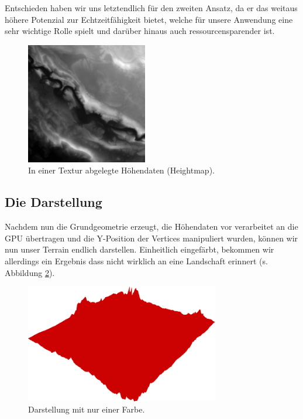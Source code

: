 \begin{Spacing}{\mylinespace}
Entschieden haben wir uns letztendlich für den zweiten Ansatz, da er das weitaus höhere Potenzial zur Echtzeitfähigkeit bietet, welche für unsere Anwendung eine sehr wichtige Rolle spielt und darüber hinaus auch ressourcensparender ist. 

\begin{figure}[h!]
	\centering
	\vspace*{20px}
	\includegraphics[width=200px]{graphics/heightmap.jpg}
	\caption{In einer Textur abgelegte Höhendaten (Heightmap).}
	\label{fig:heightmap}
\end{figure}

\subsection{Die Darstellung}
Nachdem nun die Grundgeometrie erzeugt, die Höhendaten vor verarbeitet an die GPU übertragen und die Y-Position der Vertices manipuliert wurden, können wir nun unser Terrain endlich darstellen. Einheitlich eingefärbt, bekommen wir allerdings ein Ergebnis dass nicht wirklich an eine Landschaft erinnert (s. Abbildung \ref{fig:singleColor}). 

\begin{figure}[h!]
	\centering
	\vspace*{20px}
	\includegraphics[width=320px]{graphics/singleColor.png}
	\caption{Darstellung mit nur einer Farbe.}
	\label{fig:singleColor}
\end{figure}


\end{Spacing}

